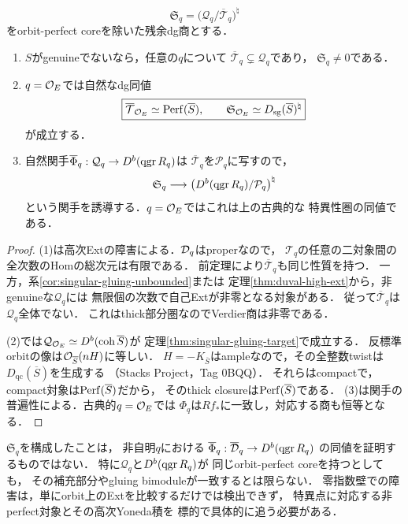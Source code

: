 \begin{theorem}[零指数壁における残余特異性]\label{thm:residual-singularity}
\[
 \mathfrak S_q=
 \bigl(\mathcal Q_q/\overline{\mathcal T}_q\bigr)^\natural
\]
をorbit-perfect coreを除いた残余dg商とする．
\begin{enumerate}
\item $S$がgenuineでないなら，任意の$q$について
$\overline{\mathcal T}_q\subsetneq\mathcal Q_q$であり，
$\mathfrak S_q\ne0$である．
\item $q=\mathcal O_E$では自然なdg同値
\[
 \boxed{\overline{\mathcal T}_{\mathcal O_E}\simeq\operatorname{Perf}(\overline S),
 \qquad
 \mathfrak S_{\mathcal O_E}\simeq D_{\rm sg}(\overline S)^\natural}
\]
が成立する．
\item 自然関手$\overline\Phi_q:\mathcal Q_q\to D^b(\operatorname{qgr} R_q)$は
$\overline{\mathcal T}_q$を$\mathcal P_q$に写すので，
\[
 \mathfrak S_q\longrightarrow
 \bigl(D^b(\operatorname{qgr} R_q)/\mathcal P_q\bigr)^\natural
\]
という関手を誘導する．$q=\mathcal O_E$ではこれは上の古典的な
特異性圏の同値である．
\end{enumerate}
\end{theorem}
\begin{proof}
(1)は高次Extの障害による．$\mathcal D_q$はproperなので，
$\mathcal T_q$の任意の二対象間の全次数のHomの総次元は有限である．
前定理により$\overline{\mathcal T}_q$も同じ性質を持つ．
一方，系\ref{cor:singular-gluing-unbounded}または
定理\ref{thm:duval-high-ext}から，非genuineな$\mathcal Q_q$には
無限個の次数で自己Extが非零となる対象がある．
従って$\overline{\mathcal T}_q$は$\mathcal Q_q$全体でない．
これはthick部分圏なのでVerdier商は非零である．

(2)では$\mathcal Q_{\mathcal O_E}\simeq D^b(\operatorname{coh}\overline S)$が
定理\ref{thm:singular-gluing-target}で成立する．
反標準orbitの像は$\mathcal O_{\overline S}(nH)$に等しい．
$H=-K_{\overline S}$はampleなので，その全整数twistは
$D_{\mathrm{qc}}(\overline S)$を生成する
（Stacks Project\cite{Stacks}，Tag 0BQQ）．
それらはcompactで，compact対象は$\operatorname{Perf}(\overline S)$だから，
そのthick closureは$\operatorname{Perf}(\overline S)$である．
(3)は関手の普遍性による．古典的$q=\mathcal O_E$では
$\Phi_q$は$Rf_*$に一致し，対応する商も恒等となる．
\end{proof}
\begin{remark}[何を解決していないか]
$\mathfrak S_q$を構成したことは，
非自明$q$における
$\overline\Phi_q:\overline{\mathcal D}_q\to D^b(\operatorname{qgr} R_q)$
の同値を証明するものではない．
特に$\mathcal Q_q$と$D^b(\operatorname{qgr} R_q)$が
同じorbit-perfect coreを持つとしても，
その補充部分やgluing bimoduleが一致するとは限らない．
零指数壁での障害は，単にorbit上のExtを比較するだけでは検出できず，
特異点に対応する非perfect対象とその高次Yoneda積を
標的で具体的に追う必要がある．
\end{remark}
